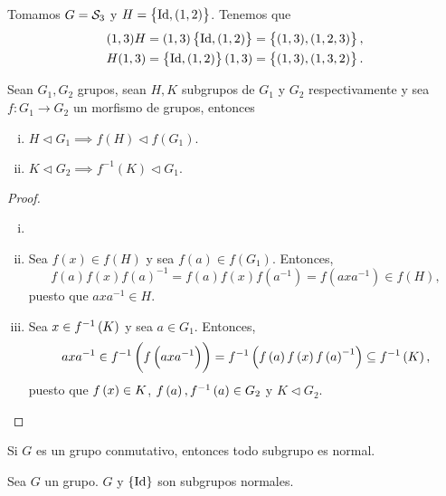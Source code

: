 \begin{example}
    Tomamos $G = \mathcal{S}_3$ y $H = \left\{ \operatorname{Id}, (1,2)\right\}$. Tenemos que
    \[
        \begin{aligned}
            (1,3)H &= (1,3) \left\{\operatorname{Id}, (1,2)\right\} = \left\{(1,3), (1,2,3)\right\}, \\
            H(1,3) &= \left\{\operatorname{Id}, (1,2)\right\} (1,3) = \left\{(1,3), (1,3,2)\right\}.
        \end{aligned}
    \]
\end{example}

\begin{lema}
    Sean $G_1, G_2$ grupos, sean $H, K$ subgrupos de $G_1$ y $G_2$ respectivamente y sea $f \colon G_1 \to G_2$ un morfismo de grupos, entonces
    \begin{enumerate}[i)]
        \item $H \triangleleft G_1 \implies f(H) \triangleleft f\left(G_1 \right).$
        \item $K \triangleleft G_2 \implies f^{-1}(K) \triangleleft G_1.$
    \end{enumerate}
\end{lema}

\begin{proof}
    \begin{enumerate}[i)]
        \item[]
        \item Sea $f(x) \in f(H)$ y sea $f(a) \in f\left( G_1 \right)$. Entonces,
            \[
                f(a) f(x) f(a)^{-1} = f(a) f(x) f\left( a^{-1} \right) =
                f\left( axa^{-1} \right) \in f(H),
            \]
            puesto que $axa^{-1} \in H$.
        \item Sea $x\in f^{-1}\left( K\right)$ y sea $a\in G_1$. Entonces,
            \[
                axa^{-1} \in f^{-1}\left( f\left( axa^{-1} \right) \right) = f^{-1}\left( f\left( a\right) f\left( x\right) f\left( a\right) ^{-1} \right) \subseteq f^{-1}\left( K\right),
            \]
            puesto que $f\left( x\right)\in K$, $f\left( a\right), f^{-1}\left( a\right) \in G_2$ y $K \triangleleft G_2$.
    \end{enumerate}
\end{proof}

\begin{obs}
    Si $G$ es un grupo conmutativo, entonces todo subgrupo es normal.
\end{obs}

\begin{obs}
    Sea $G$ un grupo. $G$ y $\left\{\operatorname{Id}\right\}$ son subgrupos normales.
\end{obs}

